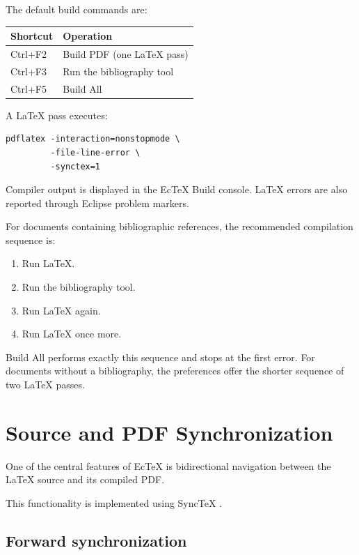 \documentclass[11pt,a4paper]{article}
\begin{document}
The default build commands are:

\begin{center}
\begin{tabular}{ll}
\toprule
\textbf{Shortcut} & \textbf{Operation} \\
\midrule
Ctrl+F2 & Build PDF (one LaTeX pass) \\
Ctrl+F3 & Run the bibliography tool \\
Ctrl+F5 & Build All \\
\bottomrule
\end{tabular}
\end{center}

A LaTeX pass executes:

\begin{lstlisting}
pdflatex -interaction=nonstopmode \
         -file-line-error \
         -synctex=1
\end{lstlisting}

Compiler output is displayed in the EcTeX Build console.
LaTeX errors are also reported through Eclipse problem
markers.

For documents containing bibliographic references,
the recommended compilation sequence is:

\begin{enumerate}[noitemsep]
    \item Run LaTeX.
    \item Run the bibliography tool.
    \item Run LaTeX again.
    \item Run LaTeX once more.
\end{enumerate}

Build All performs exactly this sequence and stops at the
first error. For documents without a bibliography, the
preferences offer the shorter sequence of two LaTeX passes.

\section{Source and PDF Synchronization}

One of the central features of EcTeX is bidirectional
navigation between the LaTeX source and its compiled PDF.

This functionality is implemented using SyncTeX
\cite{synctex}.

\subsection{Forward synchronization}
\end{document}
